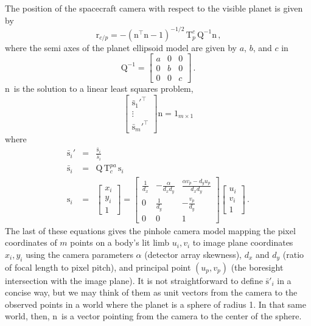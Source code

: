 \documentclass[12pt]{article}
\newcommand{\Tf}[2]{\ensuremath{\mathrm{T}_{#1}^{#2}}}
\newcommand{\vecr}{\ensuremath{\mathrm{r}}}
\newcommand{\vecn}{\ensuremath{\mathrm{n}}}
\begin{document}
The position of the spacecraft camera with respect to the visible planet is given by
\begin{equation}
\vecr_{c/p} = -(\vecn^\top \vecn - 1)^{-1/2} \, \Tf{p}{c}\, \mathrm{Q}^{-1} \vecn\,\text{,}\label{eq:horizon_model}
\end{equation}
where the semi axes of the planet ellipsoid model are given by $a$, $b$, and $c$ in 
\begin{equation}
\mathrm{Q}^{-1} = \begin{bmatrix} a & 0 & 0 \\ 0 & b & 0 \\ 0 & 0 & c\end{bmatrix}\,\text{.}
\end{equation}
\vecn\ is the solution to a linear least squares problem,
\begin{equation}
\begin{bmatrix} %
\bar{\mathrm{s}}_1'^\top \\ %
\vdots \\
\bar{\mathrm{s}}_m'^\top %
\end{bmatrix}\mathrm{n} = 1_{m\times 1}
\end{equation}
where
\begin{eqnarray}
\bar{\mathrm{s}}_i' &=& \frac{\bar{\mathrm{s}}_i}{\bar{s}_i} \nonumber\\
\bar{\mathrm{s}}_i &=& \mathrm{Q}\, \Tf{c}{pa}\, \mathrm{s}_i \nonumber\\
\mathrm{s}_i &=& \begin{bmatrix}x_i \\ y_i \\ 1\end{bmatrix} = \begin{bmatrix}%
\frac{1}{d_x} & -\frac{\alpha}{d_x d_y} & \frac{\alpha v_p - d_y u_p}{d_x d_y} \\
0 & \frac{1}{d_y} & -\frac{v_p}{d_y} \\
0 & 0 & 1\end{bmatrix}\begin{bmatrix}u_i \\ v_i \\ 1\end{bmatrix}\,\nonumber\text{.}
\end{eqnarray}
The last of these equations gives the pinhole camera model mapping the pixel coordinates of $m$ points on a body's lit limb $u_i, v_i$ to image plane coordinates $x_i, y_i$ using the camera parameters $\alpha$ (detector array skewness), $d_x$ and $d_y$ (ratio of focal length to pixel pitch), and principal point $(u_p, v_p)$ (the boresight intersection with the image plane). It is not straightforward to define $\bar{\mathrm{s}}'_i$ in a concise way, but we may think of them as unit vectors from the camera to the observed points in a world where the planet is a sphere of radius 1. In that same world, then, \vecn\ is a vector pointing from the camera to the center of the sphere. \citep{Christian2016}
\end{document}
